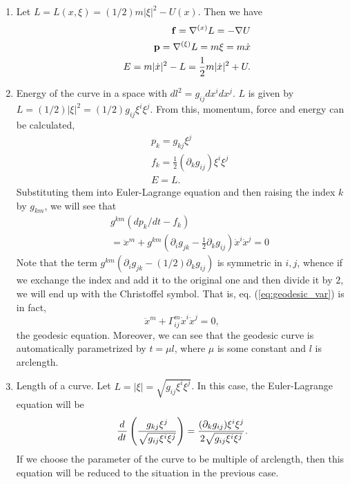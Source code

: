 \begin{example}
	\begin{enumerate}
		\item Let $L = L(x, \xi) = (1/2)m |\xi|^2 - U(x)$. Then we have
		\begin{eqnarray}
		&&\mathbf{f} = \nabla^{(x)}L = -\nabla U \\
		&&\mathbf{p} = \nabla^{(\xi)}L = m\xi = m\dot{x} \\
		&&E = m|\dot{x}|^2 - L = \frac{1}{2}m|\dot{x}|^2 + U.
		\end{eqnarray}
		
		\item Energy of the curve in a space with $dl^2 = g_{ij} dx^i dx^j$. $L$ is given by $L = (1/2)|\xi|^2 = (1/2)g_{ij} \xi^i \xi^j$. From this, momentum, force and energy can be calculated,
		\begin{eqnarray}
			&&p_k = g_{kj}\xi^j
			\nonumber\\
			&&f_k = \frac{1}{2}(\partial_k g_{ij}) \xi^i \xi^j
			\nonumber\\
			&&E   = L.
			\nonumber
		\end{eqnarray}
		Substituting them into Euler-Lagrange equation and then raising the index $k$ by $g_{km}$, we will see that
		\begin{eqnarray}
		&& g^{km} \left( dp_k/dt - f_k \right)
		\nonumber\\
		&&= \ddot{x}^m + g^{km} \left( \partial_i g_{jk} - \frac{1}{2} \partial_k g_{ij} \right) \dot{x}^i \dot{x}^j = 0
		\label{eq:geodesic_var}
		\end{eqnarray}
		Note that the term $g^{km} \left( \partial_i g_{jk} - (1/2) \partial_k g_{ij} \right)$ is symmetric in $i, j$, whence if we exchange the index and add it to the original one and then divide it by $2$, we will end up with the Christoffel symbol. That is, eq. (\ref{eq:geodesic_var}) is in fact, \[ \ddot{x}^m + \Gamma^m_{ij} \dot{x}^i \dot{x}^j = 0, \] the geodesic equation. Moreover, we can see that the geodesic curve is automatically parametrized by $t = \mu l$, where $\mu$ is some constant and $l$ is arclength.
		
		\item Length of a curve. Let $L = |\xi| = \sqrt{g_{ij}\xi^i \xi^j}$. In this case, the Euler-Lagrange equation will be
		\[ \frac{d^{}  }{d t^{}} \left( \frac{g_{kj} \xi^j}{\sqrt{g_{ij}\xi^i \xi^j}} \right) = \frac{ (\partial_k g_{ij}) \xi^i \xi^j}{2\sqrt{g_{ij}\xi^i \xi^j}}. \] If we choose the parameter of the curve to be multiple of arclength, then this equation will be reduced to the situation in the previous case.
	\end{enumerate}
\end{example}

